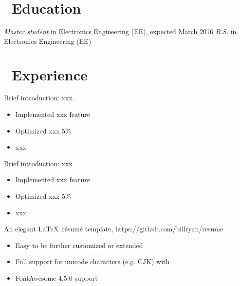 \documentclass{resume}
\begin{document}
\section{\faGraduationCap\ Education}
\textit{Master student} in Electronics Engineering (EE), expected March 2016
\textit{B.S.} in Electronics Engineering (EE)

\section{\faUsers\ Experience}
Brief introduction: xxx.
\begin{itemize}
  \item Implemented xxx feature
  \item Optimized xxx 5\%
  \item xxx
\end{itemize}

Brief introduction: xxx
\begin{itemize}
  \item Implemented xxx feature
  \item Optimized xxx 5\%
  \item xxx
\end{itemize}

An elegant \LaTeX\ résumé template, https://github.com/billryan/resume
\begin{itemize}
  \item Easy to be further customized or extended
  \item Full support for unicode characters (e.g. CJK) with \XeLaTeX\
  \item FontAwesome 4.5.0 support
\end{itemize}

\end{document}
